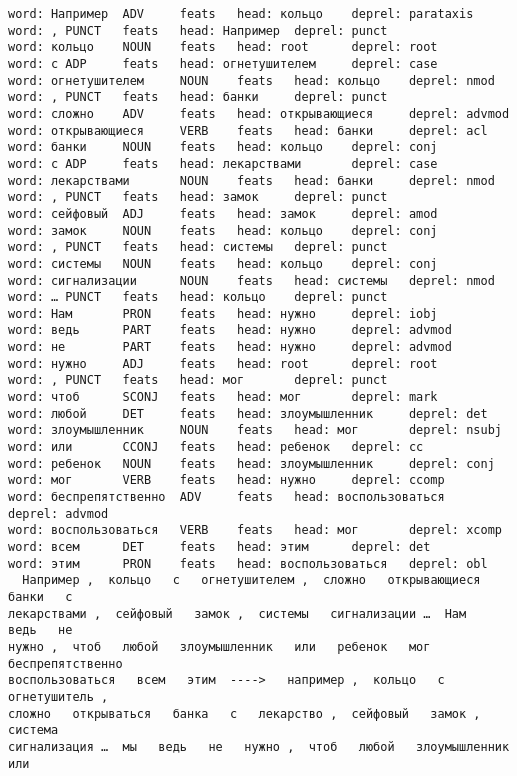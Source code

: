 \documentclass[11pt]{article}
\begin{document}
    \begin{Verbatim}[commandchars=\\\{\}]
word: Например  ADV     feats   head: кольцо    deprel: parataxis
word: , PUNCT   feats   head: Например  deprel: punct
word: кольцо    NOUN    feats   head: root      deprel: root
word: с ADP     feats   head: огнетушителем     deprel: case
word: огнетушителем     NOUN    feats   head: кольцо    deprel: nmod
word: , PUNCT   feats   head: банки     deprel: punct
word: сложно    ADV     feats   head: открывающиеся     deprel: advmod
word: открывающиеся     VERB    feats   head: банки     deprel: acl
word: банки     NOUN    feats   head: кольцо    deprel: conj
word: с ADP     feats   head: лекарствами       deprel: case
word: лекарствами       NOUN    feats   head: банки     deprel: nmod
word: , PUNCT   feats   head: замок     deprel: punct
word: сейфовый  ADJ     feats   head: замок     deprel: amod
word: замок     NOUN    feats   head: кольцо    deprel: conj
word: , PUNCT   feats   head: системы   deprel: punct
word: системы   NOUN    feats   head: кольцо    deprel: conj
word: сигнализации      NOUN    feats   head: системы   deprel: nmod
word: … PUNCT   feats   head: кольцо    deprel: punct
word: Нам       PRON    feats   head: нужно     deprel: iobj
word: ведь      PART    feats   head: нужно     deprel: advmod
word: не        PART    feats   head: нужно     deprel: advmod
word: нужно     ADJ     feats   head: root      deprel: root
word: , PUNCT   feats   head: мог       deprel: punct
word: чтоб      SCONJ   feats   head: мог       deprel: mark
word: любой     DET     feats   head: злоумышленник     deprel: det
word: злоумышленник     NOUN    feats   head: мог       deprel: nsubj
word: или       CCONJ   feats   head: ребенок   deprel: cc
word: ребенок   NOUN    feats   head: злоумышленник     deprel: conj
word: мог       VERB    feats   head: нужно     deprel: ccomp
word: беспрепятственно  ADV     feats   head: воспользоваться   deprel: advmod
word: воспользоваться   VERB    feats   head: мог       deprel: xcomp
word: всем      DET     feats   head: этим      deprel: det
word: этим      PRON    feats   head: воспользоваться   deprel: obl
  Например ,  кольцо   с   огнетушителем ,  сложно   открывающиеся   банки   с
лекарствами ,  сейфовый   замок ,  системы   сигнализации …  Нам   ведь   не
нужно ,  чтоб   любой   злоумышленник   или   ребенок   мог   беспрепятственно
воспользоваться   всем   этим  ---->   например ,  кольцо   с   огнетушитель ,
сложно   открываться   банка   с   лекарство ,  сейфовый   замок ,  система
сигнализация …  мы   ведь   не   нужно ,  чтоб   любой   злоумышленник   или

\end{Verbatim}
\end{document}
